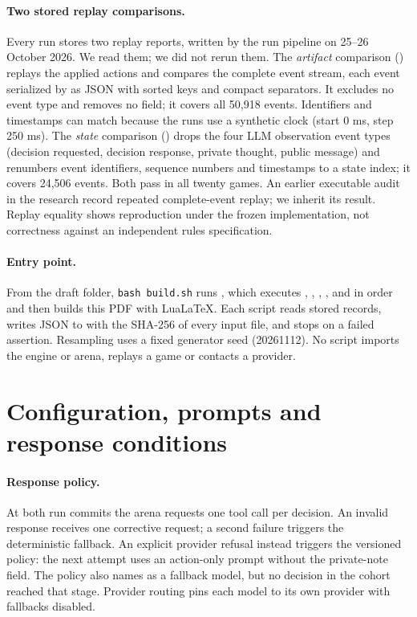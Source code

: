 \paragraph{Two stored replay comparisons.} Every run stores two replay reports, written by the run pipeline on 25--26 October 2026. We read them; we did not rerun them. The \emph{artifact} comparison () replays the applied actions and compares the complete event stream, each event serialized by  as JSON with sorted keys and compact separators. It excludes no event type and removes no field; it covers all 50,918 events. Identifiers and timestamps can match because the runs use a synthetic clock (start 0 ms, step 250 ms). The \emph{state} comparison () drops the four LLM observation event types (decision requested, decision response, private thought, public message) and renumbers event identifiers, sequence numbers and timestamps to a state index; it covers 24,506 events. Both pass in all twenty games. An earlier executable audit in the research record repeated complete-event replay; we inherit its result. Replay equality shows reproduction under the frozen implementation, not correctness against an independent rules specification.

\paragraph{Entry point.} From the draft folder, \texttt{bash build.sh} runs , which executes , , , ,  and  in order and then builds this PDF with LuaLaTeX. Each script reads stored records, writes JSON to  with the SHA-256 of every input file, and stops on a failed assertion. Resampling uses a fixed generator seed (20261112). No script imports the engine or arena, replays a game or contacts a provider.

\FloatBarrier
\section{Configuration, prompts and response conditions}
\label{app:prompts}

\paragraph{Response policy.} At both run commits the arena requests one tool call per decision. An invalid response receives one corrective request; a second failure triggers the deterministic  fallback. An explicit provider refusal instead triggers the versioned  policy: the next attempt uses an action-only prompt without the private-note field. The policy also names  as a fallback model, but no decision in the cohort reached that stage. Provider routing pins each model to its own provider with fallbacks disabled.

